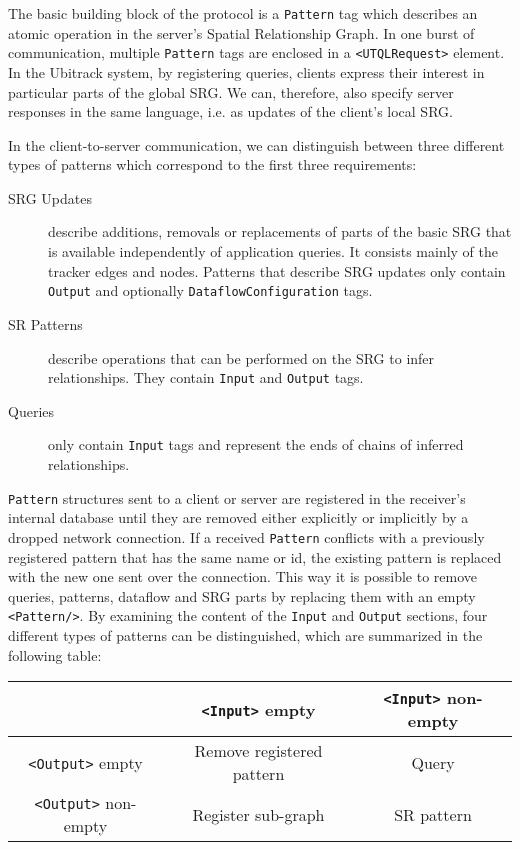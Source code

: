 \documentclass[11pt]{article}
\begin{document}
 
The basic building block of the protocol is a \texttt{Pattern}
tag which describes an atomic operation in the server's Spatial
Relationship Graph. In one burst of communication, multiple 
\texttt{Pattern} tags are enclosed in a \texttt{<UTQLRequest>}
element. In the Ubitrack system, by registering queries, clients
express their interest in particular parts of the global SRG. We can,
therefore, also specify server responses in the same language, i.e. as updates
of the client's local SRG.

In the client-to-server communication, we
can distinguish between three different types of patterns which correspond to
the first three requirements:

\begin{description}
\item[SRG Updates]
describe additions, removals or replacements of parts of the basic SRG that is
available independently of application queries. It consists mainly of the
tracker edges and nodes. Patterns that describe SRG updates only contain 
\texttt{Output} and optionally \texttt{Data\-flow\-Configuration} tags.

\item[SR Patterns]
describe operations that can be performed on the SRG to infer relationships.
They contain \texttt{Input} and \texttt{Output} tags.

\item[Queries]
only contain \texttt{Input} tags and represent the ends of chains of inferred relationships.
\end{description}

\texttt{Pattern} structures sent to a client or server are registered in the
receiver's internal database until they are removed either explicitly or
implicitly by a dropped network connection. If a received \texttt{Pattern} conflicts with a previously registered pattern that has the same name or id, the existing pattern is replaced with the new one sent over the connection.
This way it is possible to remove queries, patterns, dataflow and SRG parts by
replacing them with an empty \texttt{<Pattern/>}. By examining the content of the 
\texttt{Input} and \texttt{Output} sections, four different types of patterns can be distinguished, which are
summarized in the following table:

\medskip
\begin{tabular}{|c|c|c|}
\hline
& \footnotesize \texttt{<Input>} empty & \footnotesize \texttt{<Input>} non-empty \\
\hline
\footnotesize \texttt{<Output>} empty & \footnotesize Remove registered pattern & \footnotesize Query \\
\hline
\footnotesize \texttt{<Output>} non-empty & \footnotesize Register sub-graph & \footnotesize SR pattern \\
\hline
\end{tabular}
\end{document}
